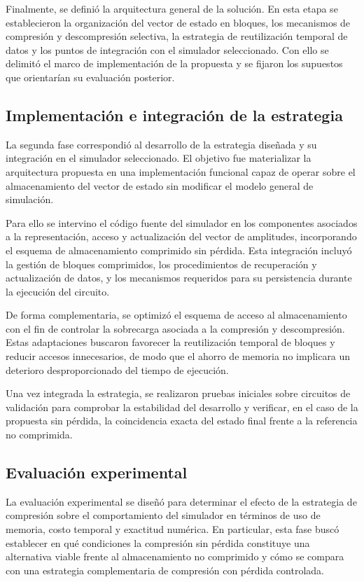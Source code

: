 Finalmente, se definió la arquitectura general de la solución. En esta etapa se
establecieron la organización del vector de estado en bloques, los mecanismos de
compresión y descompresión selectiva, la estrategia de reutilización temporal de datos
y los puntos de integración con el simulador seleccionado. Con ello se delimitó el
marco de implementación de la propuesta y se fijaron los supuestos que orientarían su
evaluación posterior.

\subsection{\normalsize Implementación e integración de la estrategia}

La segunda fase correspondió al desarrollo de la estrategia diseñada y su integración en
el simulador seleccionado. El objetivo fue materializar la arquitectura propuesta en una
implementación funcional capaz de operar sobre el almacenamiento del vector de
estado sin modificar el modelo general de simulación.

Para ello se intervino el código fuente del simulador en los componentes asociados a la
representación, acceso y actualización del vector de amplitudes, incorporando el
esquema de almacenamiento comprimido sin pérdida. Esta integración incluyó la
gestión de bloques comprimidos, los procedimientos de recuperación y actualización de
datos, y los mecanismos requeridos para su persistencia durante la ejecución del
circuito.

De forma complementaria, se optimizó el esquema de acceso al almacenamiento con el
fin de controlar la sobrecarga asociada a la compresión y descompresión. Estas
adaptaciones buscaron favorecer la reutilización temporal de bloques y reducir accesos
innecesarios, de modo que el ahorro de memoria no implicara un deterioro desproporcionado
del tiempo de ejecución.

Una vez integrada la estrategia, se realizaron pruebas iniciales sobre circuitos de
validación para comprobar la estabilidad del desarrollo y verificar, en el caso de la
propuesta sin pérdida, la coincidencia exacta del estado final frente a la referencia no
comprimida.

\subsection{\normalsize Evaluación experimental}

La evaluación experimental se diseñó para determinar el efecto de la estrategia de
compresión sobre el comportamiento del simulador en términos de uso de memoria,
costo temporal y exactitud numérica. En particular, esta fase buscó establecer en qué
condiciones la compresión sin pérdida constituye una alternativa viable frente al
almacenamiento no comprimido y cómo se compara con una estrategia complementaria
de compresión con pérdida controlada.

